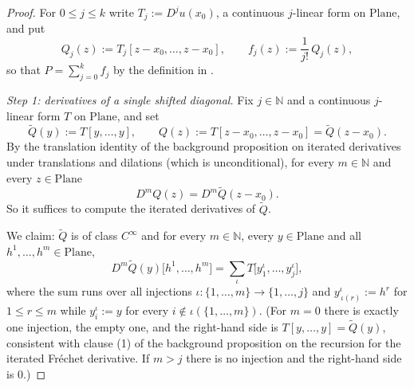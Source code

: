 \begin{proof}
For $0\le j\le k$ write $T_j:=D^{j}u(x_0)$, a continuous $j$-linear form on $\mathrm{Plane}$,
and put
\[
  Q_j(z):=T_j[z-x_0,\ldots,z-x_0],\qquad f_j(z):=\frac{1}{j!}\,Q_j(z),
\]
so that $P=\sum_{j=0}^{k}f_j$ by the definition in .

\medskip\noindent\emph{Step 1: derivatives of a single shifted diagonal.}
Fix $j\in\mathbb{N}$ and a continuous $j$-linear form $T$ on $\mathrm{Plane}$, and set
\[
  \widetilde{Q}(y):=T[y,\ldots,y],\qquad Q(z):=T[z-x_0,\ldots,z-x_0]=\widetilde{Q}(z-x_0).
\]
By the translation identity of the background proposition on iterated derivatives under
translations and dilations (which is unconditional), for every $m\in\mathbb{N}$ and every
$z\in\mathrm{Plane}$
\begin{equation}\label{eq:tpd-shift}
  D^{m}Q(z)=D^{m}\widetilde{Q}(z-x_0).
\end{equation}
So it suffices to compute the iterated derivatives of $\widetilde{Q}$.

We claim: $\widetilde{Q}$ is of class $C^{\infty}$ and for every $m\in\mathbb{N}$, every
$y\in\mathrm{Plane}$ and all $h^{1},\ldots,h^{m}\in\mathrm{Plane}$,
\begin{equation}\label{eq:tpd-formula}
  D^{m}\widetilde{Q}(y)\bigl[h^{1},\ldots,h^{m}\bigr]
  =\sum_{\iota}T\bigl[y^{\iota}_1,\ldots,y^{\iota}_j\bigr],
\end{equation}
where the sum runs over all injections $\iota\colon\{1,\ldots,m\}\to\{1,\ldots,j\}$ and
$y^{\iota}_{\,\iota(r)}:=h^{r}$ for $1\le r\le m$ while $y^{\iota}_{i}:=y$ for every
$i\notin\iota(\{1,\ldots,m\})$.  (For $m=0$ there is exactly one injection, the empty one, and
the right-hand side is $T[y,\ldots,y]=\widetilde{Q}(y)$, consistent with clause (1) of the
background proposition on the recursion for the iterated Fr\'echet derivative.  If $m>j$ there
is no injection and the right-hand side is $0$.)


\end{proof}
